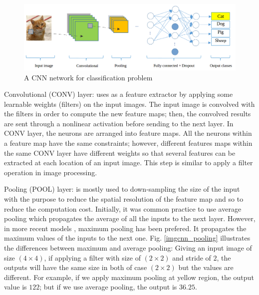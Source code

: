 \documentclass[review]{elsarticle}
\begin{document}
\begin{figure}[!h]
	\centering
	\includegraphics[scale=.3]{images/cnn_network_2}
	\caption{A CNN network for classification problem}
	\label{imgcnn_network}
\end{figure}

Convolutional (CONV) layer: uses as a feature extractor by applying some learnable weights (filters) on the input images. The input image is convolved with the filters in order to compute the new feature maps; then, the convolved results are sent through a nonlinear activation before sending to the next layer. In CONV layer, the neurons are arranged into feature maps. All the neurons within a feature map have the same constraints; however, different features maps within the same CONV layer have different weights so that several features can be extracted at each location of an input image. This step is similar to apply a filter operation in image processing.

Pooling (POOL) layer: is mostly used to down-sampling the size of the input with the purpose to reduce the spatial resolution of the feature map and so to reduce the computation cost. Initially, it was common practice to use average pooling which propagates the average of all the inputs to the next layer. However, in more recent models \cite{krizhevsky2012imagenet, ciregan2012multi, li2015convolutional}, maximum pooling has been prefered. It propagates the maximum values of the inputs to the next one. Fig. \ref{imgcnn_pooling} illustrates the differences between maximum and average pooling: Giving an input image of size $(4 \times 4)$, if applying a filter with size of $(2 \times 2)$ and stride of $2$, the outputs will have the same size in both of case $(2 \times 2)$ but the values are different. For example, if we apply maximum pooling at yellow region, the output value is $122$; but if we use average pooling, the output is $36.25$.

\end{document}
